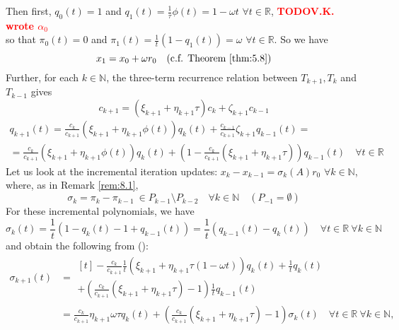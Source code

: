 \documentclass[12pt]{article}
\theoremstyle{definition}
\theoremstyle{remark}
\numberwithin{equation}{section}
\newcommand{\R}{\mathbb{R}}
\newcommand{\N}{\mathbb{N}}
\newcommand{\TODO}[1][]{\textcolor{red}{\textbf{TODO\ifblank{#1}{}{:\ }#1}}\\}
\begin{document}
\begin{enumerate}[label=(\roman*)]
      Then first, $q_0(t) = 1$ and $q_1(t) = \frac{1}{\tau} \phi(t) = 1 - \omega t$ $\forall t \in \R$, \TODO[V.K. wrote $\alpha_0$] so that $\pi_0(t) =  0$ and $\pi_1(t) = \frac{1}{t} (1 - q_1(t)) = \omega$ $\forall t \in \R$. So we have
      \begin{equation*}
        x_1 = x_0 + \omega r_0 \quad \text{(c.f. Theorem \ref{thm:5.8})}
      \end{equation*}
      Further, for each $k \in \N$, the three-term recurrence relation between $T_{k+1}, T_k$ and $T_{k-1}$ gives
      \begin{equation*}
        c_{k+1} = (\xi_{k+1} + \eta_{k+1} \tau) c_k + \zeta_{k+1} c_{k-1} \tag{$\star$}
      \end{equation*}
      \begin{multline*}
        q_{k+1}(t) = \frac{c_k}{c_{k+1}} (\xi_{k+1} + \eta_{k+1} \phi(t)) q_k(t) + \frac{c_{k-1}}{c_{k+1}} \zeta_{k+1} q_{k-1}(t)=\\
        = \frac{c_k}{c_{k+1}} (\xi_{k+1} + \eta_{k+1} \phi(t)) q_k(t) + (1 - \frac{c_k}{c_{k+1}}(\xi_{k+1} + \eta_{k+1} \tau)) q_{k-1}(t) \quad \forall t \in \R \tag{\textasteriskcentered}
      \end{multline*}
      Let us look at the incremental iteration updates:
      $x_k - x_{k-1} = \sigma_k(A) r_0$ $\forall k \in \N$, where, as in Remark \ref{rem:8.1},
      \begin{equation*}
        \sigma_k = \pi_k - \pi_{k-1}\ \in P_{k-1}\setminus P_{k-2} \quad \forall k \in \N \quad (P_{-1} = \emptyset)
      \end{equation*}
      For these incremental polynomials, we have
      \begin{equation*}
        \sigma_k(t) = \frac{1}{t} (1 - q_k(t) - 1 + q_{k-1}(t)) = \frac{1}{t} (q_{k-1}(t) - q_k(t)) \quad \forall t \in \R\ \forall k \in \N
      \end{equation*}
      and obtain the following from (\textasteriskcentered):
      \begin{align*}
        \sigma_{k+1}(t) &=
        \begin{multlined}[t]
          - \frac{c_k}{c_{k+1}} \frac{1}{t} (\xi_{k+1} + \eta_{k+1} \tau(1-\omega t)) q_k(t) + \frac{1}{t} q_k(t)\\+\left(\frac{c_k}{c_{k+1}}(\xi_{k+1} + \eta_{k+1} \tau) - 1\right) \frac{1}{t} q_{k-1}(t)
        \end{multlined}\\
        &= \frac{c_k}{c_{k+1}} \eta_{k+1} \omega \tau q_k(t) + \left(\frac{c_k}{c_{k+1}}(\xi_{k+1} + \eta_{k+1} \tau) - 1\right) \sigma_k(t) \quad \forall t \in \R\ \forall k \in \N,

\end{align*}
\end{enumerate}
\end{document}
